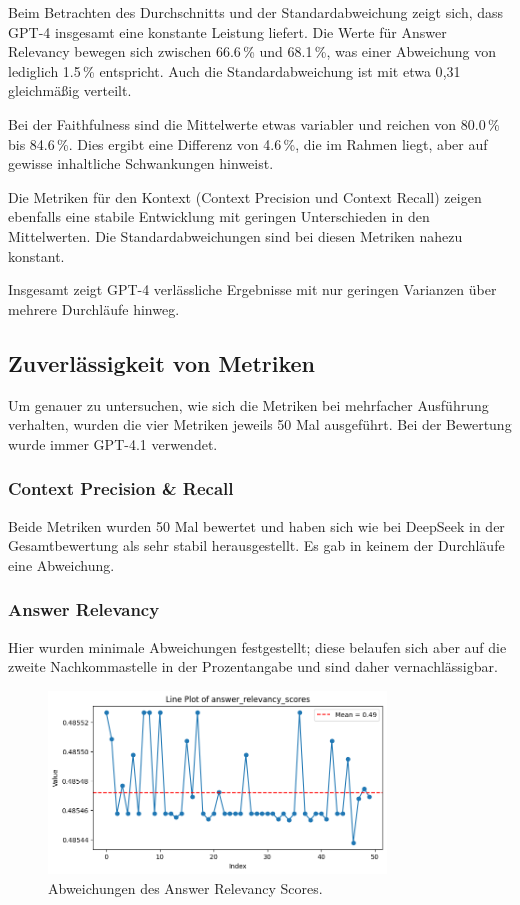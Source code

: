 Beim Betrachten des Durchschnitts und der Standardabweichung zeigt sich, dass GPT-4 insgesamt eine konstante Leistung liefert. Die Werte für Answer Relevancy bewegen sich zwischen 66.6\,\% und 68.1\,\%, was einer Abweichung von lediglich 1.5\,\% entspricht. Auch die Standardabweichung ist mit etwa 0{,}31 gleichmäßig verteilt.

Bei der Faithfulness sind die Mittelwerte etwas variabler und reichen von 80.0\,\% bis 84.6\,\%. Dies ergibt eine Differenz von 4.6\,\%, die im Rahmen liegt, aber auf gewisse inhaltliche Schwankungen hinweist.

Die Metriken für den Kontext (Context Precision und Context Recall) zeigen ebenfalls eine stabile Entwicklung mit geringen Unterschieden in den Mittelwerten. Die Standardabweichungen sind bei diesen Metriken nahezu konstant.

Insgesamt zeigt GPT-4 verlässliche Ergebnisse mit nur geringen Varianzen über mehrere Durchläufe hinweg. 


\subsection{Zuverlässigkeit von Metriken}

Um genauer zu untersuchen, wie sich die Metriken bei mehrfacher Ausführung verhalten, wurden die vier Metriken jeweils 50 Mal ausgeführt.
Bei der Bewertung wurde immer GPT-4.1 verwendet.

\subsubsection{Context Precision \& Recall}
Beide Metriken wurden 50 Mal bewertet und haben sich wie bei DeepSeek in der Gesamtbewertung als sehr stabil herausgestellt. Es gab in keinem der Durchläufe eine Abweichung.

\subsubsection{Answer Relevancy}
Hier wurden minimale Abweichungen festgestellt; diese belaufen sich aber auf die zweite Nachkommastelle in der Prozentangabe und sind daher vernachlässigbar.

\begin{figure}[htbp]
    \centering
    \includegraphics[width=0.8\textwidth]{images/answer_relevancy.png}
    \caption{Abweichungen des Answer Relevancy Scores.}
    \label{fig:answer_relevancy_deviation}
\end{figure}

